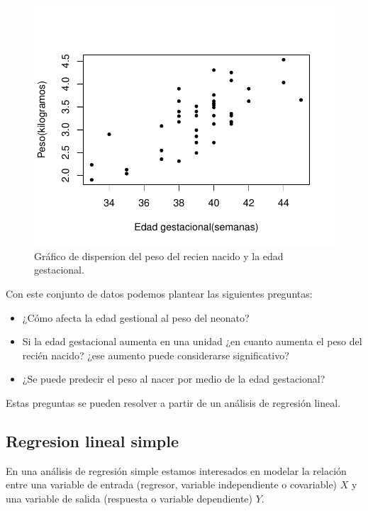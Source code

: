 \documentclass[
]{article}
\providecommand{\tightlist}{%
  \setlength{\itemsep}{0pt}\setlength{\parskip}{0pt}}
\begin{document}
\begin{figure}

{\centering \includegraphics{MLGI_files/figure-latex/birthweightFigure-1} 

}

\caption{Gráfico de dispersion del peso del recien nacido y la edad gestacional.}\label{fig:birthweightFigure}
\end{figure}

Con este conjunto de datos podemos plantear las siguientes preguntas:

\begin{itemize}
\tightlist
\item
  ¿Cómo afecta la edad gestional al peso del neonato?
\item
  Si la edad gestacional aumenta en una unidad ¿en cuanto aumenta el peso del recién nacido? ¿ese aumento puede considerarse significativo?
\item
  ¿Se puede predecir el peso al nacer por medio de la edad gestacional?
\end{itemize}

Estas preguntas se pueden resolver a partir de un análisis de regresión lineal.

\hypertarget{regresion-lineal-simple}{%
\subsection{Regresion lineal simple}\label{regresion-lineal-simple}}

En una análisis de regresión simple estamos interesados en modelar la relación entre una variable de entrada (regresor, variable independiente o covariable) \(X\) y una variable de salida (respuesta o variable dependiente) \(Y\).
\end{document}
